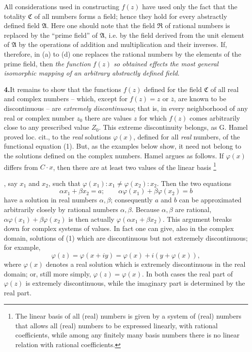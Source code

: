 \documentclass[11pt]{article}
\providecommand{\Afield}{\mathfrak A}
\providecommand{\Cfield}{\mathfrak C}
\providecommand{\Rfield}{\mathfrak R}
\providecommand{\srcfn}[2]{%
  \begingroup
  \renewcommand{\thefootnote}{#1}%
  \footnote{#2}%
  \addtocounter{footnote}{-1}%
  \endgroup}
\begin{document}
All considerations used in constructing \(f(z)\) have used only the fact that the totality \(\Cfield\) of all numbers forms a field; hence they hold for every abstractly defined field \(\Afield\). Here one should note that the field \(\Rfield\) of rational numbers is replaced by the ``prime field'' of \(\Afield\), i.e. by the field derived from the unit element of \(\Afield\) by the operations of addition and multiplication and their inverses. If, therefore, in (a) to (d) one replaces the rational numbers by the elements of the prime field, then \emph{the function} \(f(z)\) \emph{so obtained effects the most general isomorphic mapping of an arbitrary abstractly defined field}.

\medskip
\noindent\textbf{4.}\quad It remains to show that the functions \(f(z)\) defined for the field \(\Cfield\) of all real and complex numbers -- which, except for \(f(z)=z\) or \(\overline z\), are known to be discontinuous -- are \emph{extremely discontinuous}; that is, in every neighborhood of any real or complex number \(z_0\) there are values \(z\) for which \(f(z)\) comes arbitrarily close to any prescribed value \(Z_0\). This extreme discontinuity belongs, as G. Hamel proved loc. cit., to the \emph{real} solutions \(\varphi(x)\), defined for all \emph{real} numbers, of the functional equation (1). But, as the examples below show, it need not belong to the solutions defined on the complex numbers. Hamel argues as follows. If \(\varphi(x)\) differs from \(C\cdot x\), then there are at least two values of the linear basis\srcfn{*)}{The linear basis of all (real) numbers is given by a system of (real) numbers that allows all (real) numbers to be expressed linearly, with rational coefficients, while among any finitely many basis numbers there is no linear relation with rational coefficients.}, say \(x_1\) and \(x_2\), such that \(\varphi(x_1):x_1\ne\varphi(x_2):x_2\). Then the two equations
\[
\alpha x_1+\beta x_2=a;\qquad \alpha\varphi(x_1)+\beta\varphi(x_2)=b
\]
have a solution in real numbers \(\alpha,\beta\); consequently \(a\) and \(b\) can be approximated arbitrarily closely by rational numbers \(\alpha,\beta\). Because \(\alpha,\beta\) are rational, \(\alpha\varphi(x_1)+\beta\varphi(x_2)\) is then actually \(\varphi(\alpha x_1+\beta x_2)\). This argument breaks down for complex systems of values. In fact one can give, also in the complex domain, solutions of (1) which are discontinuous but not extremely discontinuous; for example,
\[
\varphi(z)=\varphi(x+iy)=\varphi(x)+i(y+\varphi(x)),
\]
where \(\varphi(x)\) denotes a real solution which is extremely discontinuous in the real domain; or, still more simply, \(\varphi(z)=\varphi(x)\). In both cases the real part of \(\varphi(z)\) is extremely discontinuous, while the imaginary part is determined by the real part.
\end{document}
